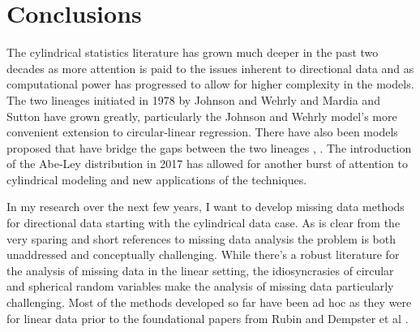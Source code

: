 \section{Conclusions}\label{conc}

The cylindrical statistics literature has grown much deeper in the past two decades as more attention is paid to the issues inherent to directional data and as computational power has progressed to allow for higher complexity in the models. The two lineages initiated in 1978 by Johnson and Wehrly \cite{johnson_angular-linear_1978} and Mardia and Sutton \cite{mardia_model_1978} have grown greatly, particularly the Johnson and Wehrly model's more convenient extension to circular-linear regression. There have also been models proposed that have bridge the gaps between the two lineages \cite{kato_dependent_2008}, \cite{mastrantonio_joint_2018}. The introduction of the Abe-Ley distribution in 2017 \cite{abe_tractable_2017} has allowed for another burst of attention to cylindrical modeling and new applications of the techniques.

In my research over the next few years, I want to develop missing data methods for directional data starting with the cylindrical data case. As is clear from the very sparing and short references to missing data analysis the problem is both unaddressed and conceptually challenging. While there's a robust literature for the analysis of missing data in the linear setting, the idiosyncrasies of circular and spherical random variables make the analysis of missing data particularly challenging. Most of the methods developed so far have been ad hoc as they were for linear data prior to the foundational papers from Rubin \cite{rubin_inference_1976} and Dempster et al \cite{dempster_maximum_1977}. 